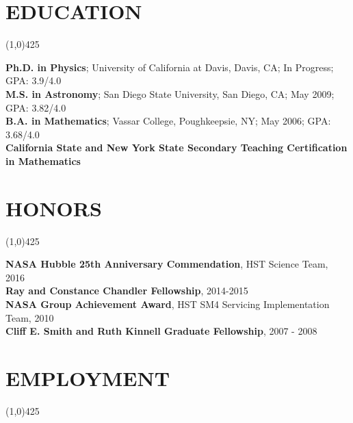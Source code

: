 \documentclass{res}
\begin{document}
\begin{resume}
\section{EDUCATION}
\vspace{-.2in} 
\begin{center}
\line(1,0){425}
\end{center}
\vspace{-.3in} 
\vspace{0.1in} 
 
   {\bf Ph.D. in Physics}; University of California at Davis, Davis, CA; In Progress; GPA: 3.9/4.0 \\
   {\bf M.S. in Astronomy}; San Diego State University, San Diego, CA; May 2009; GPA: 3.82/4.0 \\
   {\bf B.A. in Mathematics}; Vassar College, Poughkeepsie, NY; May 2006; GPA: 3.68/4.0 \\   
   {\bf California State and New York State Secondary Teaching Certification in Mathematics} 
\section{HONORS}
\vspace{-.2in} 
\begin{center}
\line(1,0){425}
\end{center}
\vspace{-.3in} 
\vspace{0.1in} 

{\bf NASA Hubble 25th Anniversary Commendation}, HST Science Team, 2016 \\ %
{\bf Ray and Constance Chandler Fellowship}, 2014-2015 \\
{\bf NASA Group Achievement Award}, HST SM4 Servicing Implementation Team, 2010 \\
{\bf Cliff E. Smith and Ruth Kinnell Graduate Fellowship}, 2007 - 2008 \\
 
\section{EMPLOYMENT}
\vspace{-.2in} 
\begin{center}
\line(1,0){425}
\end{center}
\vspace{-.3in} 
\vspace{0.1in} 


\end{resume}
\end{document}
